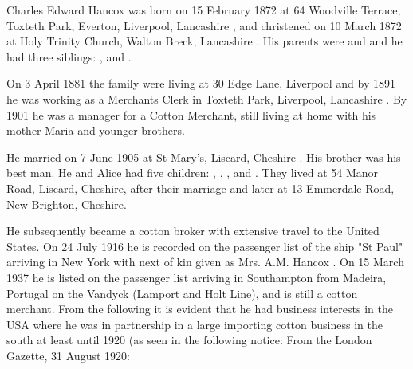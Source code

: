 
Charles Edward Hancox was born on 15 February 1872 at 64 Woodville Terrace, Toxteth Park, Everton, Liverpool, Lancashire \cite{CEHancoxBirth},  and christened on 10 March 1872 at Holy Trinity Church, Walton Breck, Lancashire \cite{CEHancoxBaptism}. His parents were  and  and he had three siblings: ,  and .


On 3 April 1881 the family were living at 30 Edge Lane, Liverpool \cite{CEHancoxResidence} and by 1891 he was working as a Merchants Clerk in Toxteth Park, Liverpool, Lancashire \cite{CEHancoxOccupation1}.
By 1901 he was a manager for a Cotton Merchant, still living at home with his mother Maria and younger brothers. 

He married  on 7 June 1905 at St Mary's, Liscard, Cheshire \cite{CEHancoxMarriage}.
His brother  was his best man.\cite{PeterKarpinski_2016-04-04}
He and Alice had five children: , , ,  and .
They lived at 54 Manor Road, Liscard, Cheshire, after their marriage\cite{CharlesEdwardHancoxHouse} and later at 13 Emmerdale Road, New Brighton, Cheshire. 

He subsequently became a cotton broker with extensive travel to the United States.  On 24 July 1916 he is recorded on the passenger list of the ship "St Paul" arriving in New York with next of kin given as Mrs. A.M. Hancox \cite{CEHancoxTravel}. On 15 March 1937 he is listed on the passenger list arriving in Southampton from Madeira, Portugal on the Vandyck (Lamport and Holt Line), and is still a cotton merchant. From the following it is evident that he had business interests in the USA where he was in partnership in a large importing cotton business in the south \cite{CEHancoxOccupation2} at least until 1920 (as seen in the following notice:
From the London Gazette, 31 August 1920:

